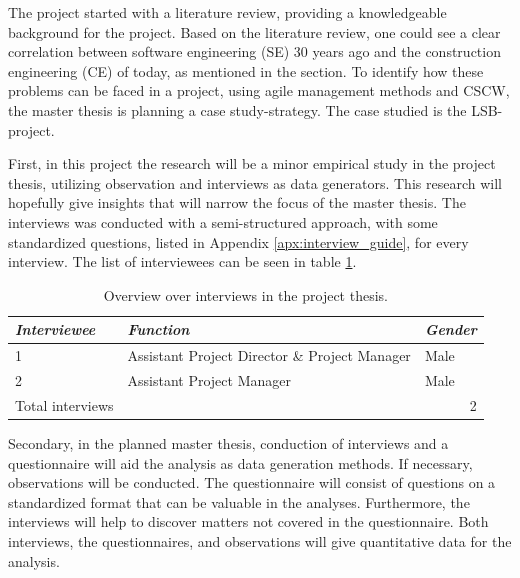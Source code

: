 The project started with a literature review, providing a knowledgeable background for the project. Based on the literature review, one could see a clear correlation between software engineering (SE) 30 years ago and the construction engineering (CE) of today, as mentioned in the  section. To identify how these problems can be faced in a project, using agile management methods and CSCW, the master thesis is planning a case study-strategy. The case studied is the LSB-project. 

First, in this project the research will be a minor empirical study in the project thesis, utilizing observation and interviews as data generators. This research will hopefully give insights that will narrow the focus of the master thesis. The interviews was conducted with a semi-structured approach, with some standardized questions, listed in Appendix \ref{apx:interview_guide}, for every interview. The list of interviewees can be seen in table \ref{tab:paticipants}. 

\begin{table}[H]
    \begin{center}
        \begin{tabular}{@{}lll@{}}
        \toprule
        \textit{Interviewee} & \textit{Function}          & \textit{Gender} \\ \midrule
        1                    & Assistant Project Director \& Project Manager & Male            \\
        2                    & Assistant Project Manager  & Male            \\
        Total interviews     & \multicolumn{2}{r}{2}                        \\ \bottomrule
        \end{tabular}
        \caption{Overview over interviews in the project thesis.}
        \label{tab:paticipants}
    \end{center}
\end{table}

Secondary, in the planned master thesis, conduction of interviews and a questionnaire will aid the analysis as data generation methods. If necessary, observations will be conducted. The questionnaire will consist of questions on a standardized format that can be valuable in the analyses. Furthermore, the interviews will help to discover matters not covered in the questionnaire. Both interviews, the questionnaires, and observations will give quantitative data for the analysis.


